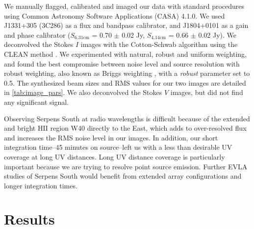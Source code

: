 \documentclass[apj]{emulateapj}
\begin{document}
We manually flagged, calibrated and imaged our data with standard procedures using Common Astronomy Software Applications (CASA) 4.1.0. We used J1331+305 (3C286) as a flux and bandpass calibrator, and J1804+0101 as a gain and phase calibrator ($S_{6.31\text{cm}}$ = 0.70 $\pm$ 0.02 Jy, $S_{4.14\text{cm}}$ = 0.66 $\pm$ 0.02 Jy). We deconvolved the Stokes $I$ images with the Cotton-Schwab algorithm \citep{Schwab84} using the CLEAN method \citep{Hogbom74,Clark80}. We experimented with natural, robust and uniform weighting, and found the best compromise between noise level and source resolution with robust weighting, also known as Briggs weighting \citep{Briggs95}, with a \emph{robust} parameter set to 0.5. The synthesized beam sizes and RMS values for our two images are detailed in \autoref{tab:image_pars}. We also deconvolved the Stokes $V$ images, but did not find any significant signal.

Observing Serpens South at radio wavelengths is difficult because of the extended and bright HII region W40 directly to the East, which adds to over-resolved flux and increases the RMS noise level in our images. In addition, our short integration time--45 minutes on source--left us with a less than desirable UV coverage at long UV distances. Long UV distance coverage is particularly important because we are trying to resolve point source emission. Further EVLA studies of Serpens South would benefit from extended array configurations and longer integration times.

\section{Results}
\label{sec:results}
\end{document}
